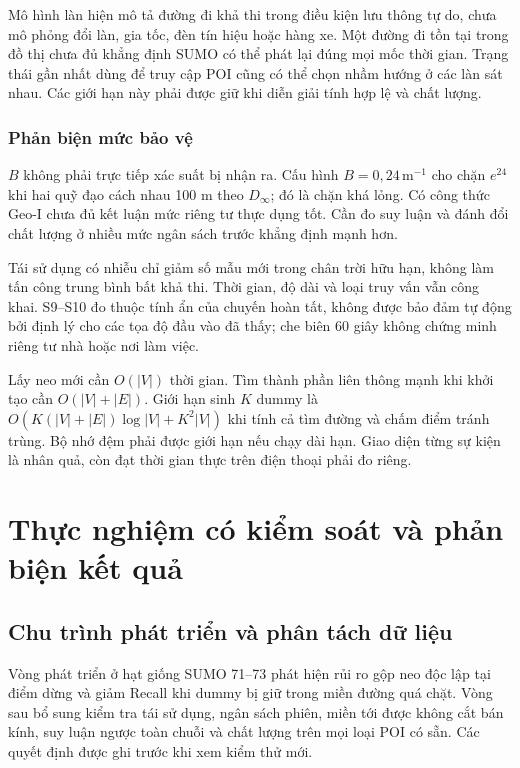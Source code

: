 Mô hình làn hiện mô tả đường đi khả thi trong điều kiện lưu thông tự do, chưa mô phỏng đổi làn, gia tốc, đèn tín hiệu hoặc hàng xe. Một đường đi tồn tại trong đồ thị chưa đủ khẳng định SUMO có thể phát lại đúng mọi mốc thời gian. Trạng thái gần nhất dùng để truy cập POI cũng có thể chọn nhầm hướng ở các làn sát nhau. Các giới hạn này phải được giữ khi diễn giải tính hợp lệ và chất lượng.

\subsection{Phản biện mức bảo vệ}

$B$ không phải trực tiếp xác suất bị nhận ra. Cấu hình $B=0{,}24\,\mathrm{m}^{-1}$ cho chặn $e^{24}$ khi hai quỹ đạo cách nhau 100 m theo $D_\infty$; đó là chặn khá lỏng. Có công thức Geo-I chưa đủ kết luận mức riêng tư thực dụng tốt. Cần đo suy luận và đánh đổi chất lượng ở nhiều mức ngân sách trước khẳng định mạnh hơn.

Tái sử dụng có nhiễu chỉ giảm số mẫu mới trong chân trời hữu hạn, không làm tấn công trung bình bất khả thi. Thời gian, độ dài và loại truy vấn vẫn công khai. S9--S10 đo thuộc tính ẩn của chuyến hoàn tất, không được bảo đảm tự động bởi định lý cho các tọa độ đầu vào đã thấy; che biên 60 giây không chứng minh riêng tư nhà hoặc nơi làm việc.

Lấy neo mới cần $O(|V|)$ thời gian. Tìm thành phần liên thông mạnh khi khởi tạo cần $O(|V|+|E|)$. Giới hạn sinh $K$ dummy là $O(K(|V|+|E|)\log|V|+K^2|V|)$ khi tính cả tìm đường và chấm điểm tránh trùng. Bộ nhớ đệm phải được giới hạn nếu chạy dài hạn. Giao diện từng sự kiện là nhân quả, còn đạt thời gian thực trên điện thoại phải đo riêng.









\chapter{Thực nghiệm có kiểm soát và phản biện kết quả}
\label{ch:experiments}

\section{Chu trình phát triển và phân tách dữ liệu}

Vòng phát triển ở hạt giống SUMO 71--73 phát hiện rủi ro gộp neo độc lập tại điểm dừng và giảm Recall khi dummy bị giữ trong miền đường quá chặt. Vòng sau bổ sung kiểm tra tái sử dụng, ngân sách phiên, miền tới được không cắt bán kính, suy luận ngược toàn chuỗi và chất lượng trên mọi loại POI có sẵn. Các quyết định được ghi trước khi xem kiểm thử mới.

